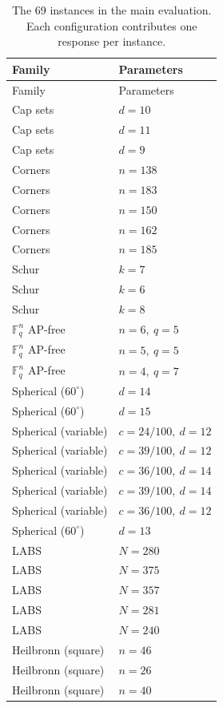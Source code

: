 \begin{longtable}{@{}P{.30\linewidth}P{.67\linewidth}@{}}
\caption{The 69 instances in the main evaluation. Each configuration contributes one response per instance.}\label{tab:tiers}\\
\toprule
Family & Parameters \\
\midrule\endfirsthead
\toprule
Family & Parameters \\
\midrule\endhead
\bottomrule\endfoot
Cap sets & $d=10$ \\
Cap sets & $d=11$ \\
Cap sets & $d=9$ \\
\addlinespace[4pt]
Corners & $n=138$ \\
Corners & $n=183$ \\
Corners & $n=150$ \\
Corners & $n=162$ \\
Corners & $n=185$ \\
\addlinespace[4pt]
Schur & $k=7$ \\
Schur & $k=6$ \\
Schur & $k=8$ \\
\addlinespace[4pt]
$\mathbb F_q^n$ AP-free & $n=6,\ q=5$ \\
$\mathbb F_q^n$ AP-free & $n=5,\ q=5$ \\
$\mathbb F_q^n$ AP-free & $n=4,\ q=7$ \\
\addlinespace[4pt]
Spherical ($60^\circ$) & $d=14$ \\
Spherical ($60^\circ$) & $d=15$ \\
Spherical (variable) & $c=24/100,\ d=12$ \\
Spherical (variable) & $c=39/100,\ d=12$ \\
Spherical (variable) & $c=36/100,\ d=14$ \\
Spherical (variable) & $c=39/100,\ d=14$ \\
Spherical (variable) & $c=36/100,\ d=12$ \\
Spherical ($60^\circ$) & $d=13$ \\
\addlinespace[4pt]
LABS & $N=280$ \\
LABS & $N=375$ \\
LABS & $N=357$ \\
LABS & $N=281$ \\
LABS & $N=240$ \\
\addlinespace[4pt]
Heilbronn (square) & $n=46$ \\
Heilbronn (square) & $n=26$ \\
Heilbronn (square) & $n=40$ \\

\end{longtable}
